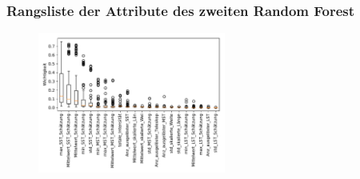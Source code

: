 \documentclass[aspectratio=1610, professionalfonts, 9pt]{beamer}
\begin{document}
  \begin{frame}
    \frametitle{Rangsliste der Attribute des zweiten Random Forest}
    \begin{figure}
      \includegraphics[width=0.55\textwidth]{pictures/feautureimportance_boxplot_secondForest.pdf}
      \caption{}
      \label{}
    \end{figure}
  \end{frame}
\end{document}
